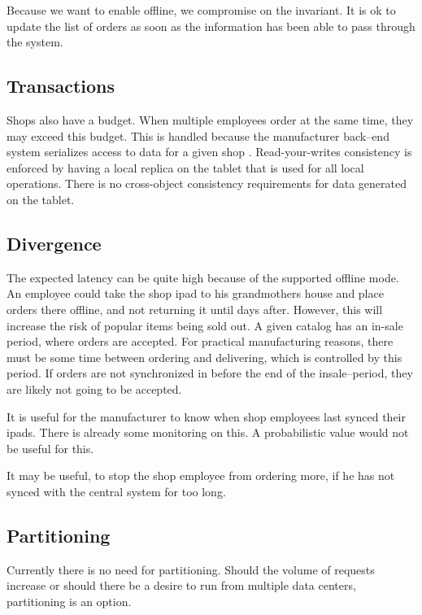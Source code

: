 \documentclass[11pt,a4paper]{report}
\begin{document}
Because we want to enable offline, we compromise on the invariant. It is ok to update the list of orders as soon as the information has been able to pass through the system.

\subsection{Transactions}
Shops also have a budget. When multiple employees order at the same time, they may exceed this budget. This is handled because the manufacturer back--end system serializes access to data for a given shop
.
Read-your-writes consistency is enforced by having a local replica on the tablet that is used for all local operations.
There is no cross-object consistency requirements for data generated on the tablet.
\subsection{Divergence}
The expected latency can be quite high because of the supported offline mode. An employee could take the shop ipad to his grandmothers house and place orders there offline, and not returning it until days after.
However, this will increase the risk of popular items being sold out.
A given catalog has an in-sale period, where orders are accepted. For practical manufacturing reasons, there must be some time between ordering and delivering, which is controlled by this period. If orders are not synchronized in before the end of the insale--period, they are likely not going to be accepted.

It is useful for the manufacturer to know when shop employees last synced their ipads. There is already some monitoring on this. A probabilistic value would not be useful for this.

It may be useful, to stop the shop employee from ordering more, if he has not synced with the central system for too long.

\subsection{Partitioning}
Currently there is no need for partitioning. Should the volume of requests increase or should there be a desire to run from multiple data centers, partitioning is an option.
\end{document}
